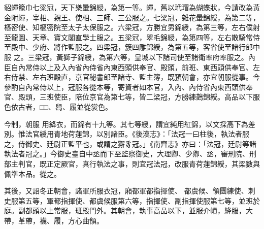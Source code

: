 \begin{pinyinscope}
 貂蟬籠巾七梁冠，天下樂暈錦綬，為第一等。蟬，舊以玳瑁為蝴蝶狀，今請改為黃金附蟬，宰相、親王、使相、三師、三公服之。七梁冠，雜花暈錦綬，為第二等，樞密使、知樞密院至太子太保服之。六梁冠，方勝宜男錦綬，為第三等，左右僕射至龍圖、天章、寶文閣直學士服之。五梁冠，翠毛錦綬，為第四等，左右散騎常侍至殿中、少府、將作監服之。四梁冠，簇四雕錦綬，為第五等，客省使至諸行郎中服
 之。三梁冠，黃獅子錦綬，為第六等，皇城以下諸司使至諸衛率府率服之。內臣自內常侍以上及入內省內侍省內東西頭供奉官、殿頭，前班、東西頭供奉官、左右侍禁、左右班殿直，京官秘書郎至諸寺、監主簿，既預朝會，亦宜朝服從事。今參酌自內常侍以上，冠服各從本等，寄資者如本官，入內、內侍省內東西頭供奉官、殿頭，三班使臣，陪位京官為第七等，皆二梁冠，方勝練鵲錦綬。高品以下服色依古者，□□、舄、履並從裳色。



 今制，朝服
 用絳衣，而錦有十九等。其七等綬，謂宜純用紅錦，以文採高下為差別。惟法官綬用青地荷蓮錦，以別諸臣。《後漢志》：「法冠一曰柱後，執法者服之，侍御史、廷尉正監平也，或謂之獬豸冠。」《南齊志》亦曰：「法冠，廷尉等諸執法者冠之。」今御史臺自中丞而下至監察御史，大理卿、少卿、丞，審刑院、刑部主判官，既正定厥官，真行執法之事，則宜冠法冠，改服青荷蓮錦綬，其梁數與佩準本品。從之。



 其後，又詔冬正朝會，諸軍所服衣冠，廂都軍都指揮使、
 都虞候、領團練使、刺史服第五等，軍都指揮使、都虞候服第六等，指揮使、副指揮使服第七等，並班於庭。副都頭以上常服，班殿門外。其朝會，執事高品以下，並服介幘，絳服，大帶，革帶，襪、履，方心曲領。




\end{pinyinscope}
